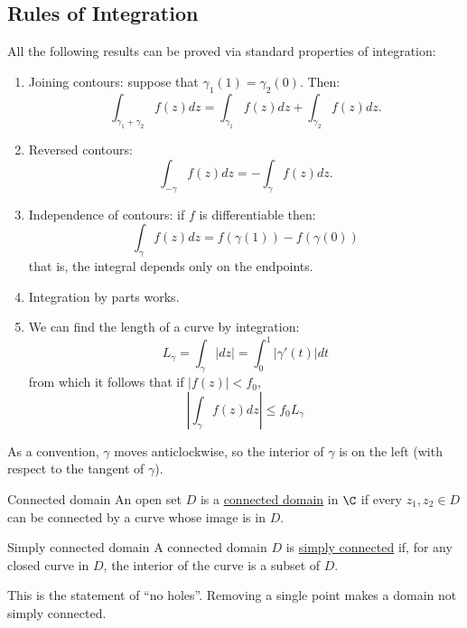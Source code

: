 \documentclass[../Main.tex]{subfiles}
\begin{document}
\subsection{Rules of Integration}
All the following results can be proved via standard properties of integration:
\begin{enumerate}
    \item Joining contours: suppose that $\gamma_1(1) = \gamma_2(0)$. Then:
        \begin{equation*}
            \int_{\gamma_1 + \gamma_2} f(z) dz = \int_{\gamma_1} f(z) dz + \int_{\gamma_2} f(z) dz.
        \end{equation*}
    \item Reversed contours:
        \begin{equation*}
            \int_{-\gamma} f(z) dz = -\int_\gamma f(z) dz.
        \end{equation*}
    \item Independence of contours: if $f$ is differentiable then:
        \begin{equation*}
            \int_\gamma f(z) dz = f(\gamma(1)) - f(\gamma(0))
        \end{equation*}
        that is, the integral depends only on the endpoints.
    \item Integration by parts works.
    \item We can find the length of a curve by integration:
        \begin{equation*}
            L_\gamma = \int_\gamma |dz| = \int_0^1 |\gamma'(t)| dt
        \end{equation*}
        from which it follows that if $|f(z)| < f_0$,
        \begin{equation*}
            \left|\int_\gamma f(z) dz\right| \leq f_0 L_\gamma
        \end{equation*}
\end{enumerate}
As a convention, $\gamma$ moves anticlockwise, so the interior of $\gamma$ is on the left (with respect to the tangent of $\gamma$).
\begin{definition}{Connected domain}
    An open set $D$ is a \underline{connected domain} in $\C$ if every $z_1, z_2 \in D$ can be connected by a curve whose image is in $D$.
\end{definition}
\begin{definition}{Simply connected domain}
    A connected domain $D$ is \underline{simply connected} if, for any closed curve in $D$, the interior of the curve is a subset of $D$.
\end{definition}
\begin{remark}
    This is the statement of ``no holes''. Removing a single point makes a domain not simply connected.
\end{remark}
\end{document}
